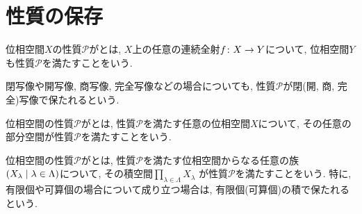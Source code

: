 \documentclass[uplatex, dvipdfmx, a4paper, 12pt, class=jsbook, crop=false]{standalone}
\begin{document}
\section{性質の保存}
\label{sec:preservation-of-properties}

\begin{definition}
	位相空間$ X $の性質$ {\mathcal P} $がとは,
	$ X $上の任意の連続全射$ f\colon X\to Y $について,
	位相空間$ Y $も性質$ {\mathcal P} $を満たすことをいう.
\end{definition}

閉写像や開写像, 商写像, 完全写像などの場合についても,
性質$ \mathcal{P} $が閉(開, 商, 完全)写像で保たれるという.

\begin{definition}
	位相空間の性質$ \mathcal{P} $がとは,
	性質$ \mathcal{P} $を満たす任意の位相空間$ X $について,
	その任意の部分空間が性質$ \mathcal{P} $を満たすことをいう.
\end{definition}

\begin{definition}
	位相空間の性質$ \mathcal{P} $がとは,
	性質$ \mathcal{P} $を満たす位相空間からなる任意の族
	$ \setfamily{X_\lambda}{\lambda \in \Lambda} $について,
	その積空間$ \prod_{\lambda \in \Lambda}  X_\lambda $
	が性質$ \mathcal{P} $を満たすことをいう.
	特に, 有限個や可算個の場合について成り立つ場合は,
	有限個(可算個)の積で保たれるという.
\end{definition}
\end{document}

